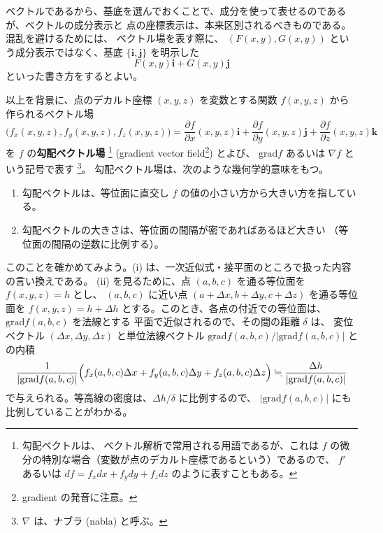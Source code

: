 \documentclass[a4paper]{jsarticle}
\theoremstyle{definition}
\theoremstyle{remark}
\begin{document}
ベクトルであるから、基底を選んでおくことで、成分を使って表せるのであるが、ベクトルの成分表示と
点の座標表示は、本来区別されるべきものである。混乱を避けるためには、
ベクトル場を表す際に、
$(F(x,y),G(x,y))$ という成分表示ではなく、基底 $\{ {\bm i}, {\bm j} \}$ を明示した
\[
F(x,y) {\bm i} + G(x,y) {\bm j}
\]
といった書き方をするとよい。

以上を背景に、点のデカルト座標 $(x,y,z)$ を変数とする関数 $f(x,y,z)$ から作られるベクトル場
\[
\bigl(f_x(x,y,z),f_y(x,y,z),f_z(x,y,z)\bigr) = \frac{\partial f}{\partial x}(x,y,z) {\bm i} 
+ \frac{\partial f}{\partial y}(x,y,z) {\bm j} 
+ \frac{\partial f}{\partial z}(x,y,z) {\bm k} 
\]
を $f$ の\textbf{勾配ベクトル場}
\footnote{勾配ベクトルは、
ベクトル解析で常用される用語であるが、これは
$f$ の微分の特別な場合（変数が点のデカルト座標であるという）であるので、
$f'$ あるいは $df = f_x dx + f_ydy + f_zdz$ のように表すこともある。}
(gradient vector field\footnote{gradient の発音に注意。}) とよび、
$\text{grad} f$ あるいは $\nabla f$ という記号で表す
\footnote{$\nabla$ は、ナブラ (nabla) と呼ぶ。}。
勾配ベクトル場は、次のような幾何学的意味をもつ。
\begin{enumerate}
\item 
勾配ベクトルは、等位面に直交し $f$ の値の小さい方から大きい方を指している。
\item 
勾配ベクトルの大きさは、等位面の間隔が密であればあるほど大きい
（等位面の間隔の逆数に比例する）。
\end{enumerate}

このことを確かめてみよう。(i) は、一次近似式・接平面のところで扱った内容の言い換えである。
(ii) を見るために、点 $(a,b,c)$ を通る等位面を $f(x,y,z) = h$ とし、
$(a,b,c)$ に近い点 $(a+\Delta x, b + \Delta y, c + \Delta z)$ を通る等位面を
$f(x,y,z) = h + \Delta h$ とする。このとき、各点の付近での等位面は、$\text{grad} f(a,b,c)$ を法線とする
平面で近似されるので、その間の距離 $\delta$ は、
変位ベクトル $(\Delta x,\Delta y, \Delta z)$ と単位法線ベクトル
$\text{grad} f(a,b,c)/|\text{grad} f(a,b,c)|$ との内積
\[
\frac{1}{|\text{grad} f(a,b,c)|} 
\Bigl( 
f_x(a,b,c)\Delta x 
+ f_y(a,b,c)\Delta y 
+ f_z(a,b,c)\Delta z
\Bigr) 
\fallingdotseq \frac{\Delta h}{|\text{grad} f(a,b,c)|}
\]
で与えられる。等高線の密度は、$\Delta h/\delta$ に比例するので、
$|\text{grad} f(a,b,c)|$ にも比例していることがわかる。
\end{document}
